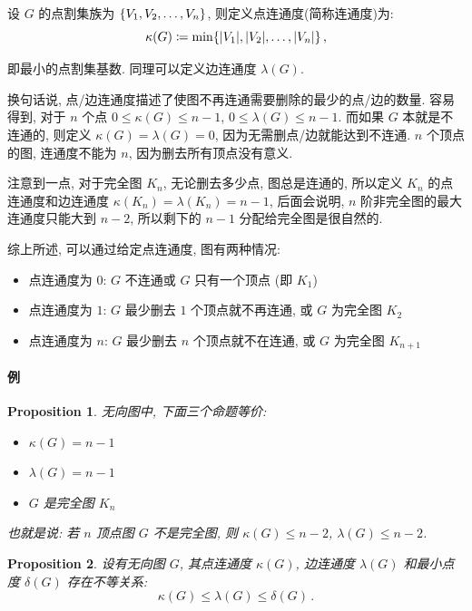 \documentclass[UTF8]{ctexart}
\theoremstyle{mystyle}
\newtheorem{proposition}{Proposition}[section]
\theoremstyle{myremark}
\theoremstyle{plain}
\DeclarePairedDelimiter\set{\{}{\}}
\begin{document}
\begin{definition}
    设 $ G $ 的点割集族为 $ \set{V_1, V_2, \dots, V_n} $, 则定义点连通度(简称连通度)为:
    \[ \kappa(G) \coloneqq \min\set{|V_1|, |V_2|, \dots, |V_n|} \,,\]

    即最小的点割集基数. 同理可以定义边连通度 $ \lambda(G) $.
\end{definition}

换句话说, 点/边连通度描述了使图不再连通需要删除的最少的点/边的数量. 容易得到, 对于 $ n $ 个点 $ 0 \leqslant \kappa(G) \leqslant n - 1 $, $ 0 \leqslant \lambda(G) \leqslant n - 1 $. 而如果 $ G $ 本就是不连通的, 则定义 $ \kappa(G) = \lambda(G) = 0 $, 因为无需删点/边就能达到不连通. $ n $ 个顶点的图, 连通度不能为 $ n $, 因为删去所有顶点没有意义.

注意到一点, 对于完全图 $ K_n $, 无论删去多少点, 图总是连通的, 所以定义 $ K_n $ 的点连通度和边连通度 $ \kappa(K_n) = \lambda(K_n) = n - 1 $, 后面会说明, $ n $ 阶非完全图的最大连通度只能大到 $ n - 2 $, 所以剩下的 $ n - 1 $ 分配给完全图是很自然的.

综上所述, 可以通过给定点连通度, 图有两种情况:
\begin{itemize}
    \item 点连通度为 $ 0 $: $ G $ 不连通或 $ G $ 只有一个顶点 (即 $ K_1 $)
    \item 点连通度为 $ 1 $: $ G $ 最少删去 $ 1 $ 个顶点就不再连通, 或 $ G $ 为完全图 $ K_2 $
    \item 点连通度为 $ n $: $ G $ 最少删去 $ n $ 个顶点就不在连通, 或 $ G $ 为完全图 $ K_{n + 1} $
\end{itemize}

\paragraph{例}



\begin{proposition}
    无向图中, 下面三个命题等价:
    \begin{itemize}
        \item $ \kappa(G) = n - 1 $
        \item $ \lambda(G) = n - 1 $
        \item $ G $ 是完全图 $ K_n $
    \end{itemize}
    也就是说: 若 $ n $ 顶点图 $ G $ 不是完全图, 则 $ \kappa(G) \leqslant n - 2 $, $ \lambda(G) \leqslant n - 2 $.
\end{proposition}

\begin{proposition}
    设有无向图 $ G $, 其点连通度 $ \kappa(G) $, 边连通度 $ \lambda(G) $ 和最小点度 $ \delta(G) $ 存在不等关系:
    \[ \kappa(G) \leqslant \lambda(G) \leqslant \delta(G) \,.\]
\end{proposition}
\end{document}
